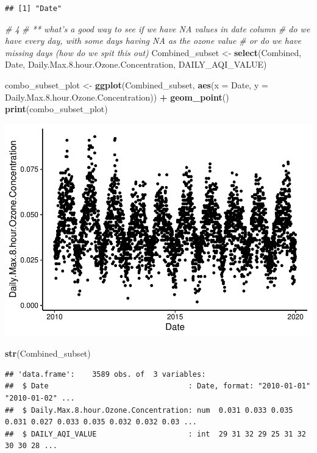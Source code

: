 \documentclass[]{article}
\newenvironment{Shaded}{\begin{snugshade}}{\end{snugshade}}
\newcommand{\CommentTok}[1]{\textcolor[rgb]{0.56,0.35,0.01}{\textit{#1}}}
\newcommand{\DataTypeTok}[1]{\textcolor[rgb]{0.13,0.29,0.53}{#1}}
\newcommand{\FloatTok}[1]{\textcolor[rgb]{0.00,0.00,0.81}{#1}}
\newcommand{\KeywordTok}[1]{\textcolor[rgb]{0.13,0.29,0.53}{\textbf{#1}}}
\newcommand{\NormalTok}[1]{#1}
\newcommand{\OperatorTok}[1]{\textcolor[rgb]{0.81,0.36,0.00}{\textbf{#1}}}
\newcommand{\StringTok}[1]{\textcolor[rgb]{0.31,0.60,0.02}{#1}}
\begin{document}
\begin{verbatim}
## [1] "Date"
\end{verbatim}

\begin{Shaded}
\begin{Highlighting}[]
\CommentTok{# 4}
\CommentTok{# ** what's a good way to see if we have NA values in date column}
  \CommentTok{# do we have every day, with some days having NA as the ozone value}
  \CommentTok{# or do we have missing days (how do we spit this out)}
\NormalTok{Combined_subset <-}\StringTok{ }\KeywordTok{select}\NormalTok{(Combined, Date, Daily.Max.}\FloatTok{8.}\NormalTok{hour.Ozone.Concentration, DAILY_AQI_VALUE)}

\NormalTok{combo_subset_plot <-}\StringTok{ }
\StringTok{  }\KeywordTok{ggplot}\NormalTok{(Combined_subset, }\KeywordTok{aes}\NormalTok{(}\DataTypeTok{x =}\NormalTok{ Date, }\DataTypeTok{y =}\NormalTok{ Daily.Max.}\FloatTok{8.}\NormalTok{hour.Ozone.Concentration)) }\OperatorTok{+}
\StringTok{  }\KeywordTok{geom_point}\NormalTok{()}
\KeywordTok{print}\NormalTok{(combo_subset_plot)}
\end{Highlighting}
\end{Shaded}

\includegraphics{A08_TimeSeries_files/figure-latex/unnamed-chunk-2-1.pdf}

\begin{Shaded}
\begin{Highlighting}[]
\KeywordTok{str}\NormalTok{(Combined_subset)}
\end{Highlighting}
\end{Shaded}

\begin{verbatim}
## 'data.frame':    3589 obs. of  3 variables:
##  $ Date                                : Date, format: "2010-01-01" "2010-01-02" ...
##  $ Daily.Max.8.hour.Ozone.Concentration: num  0.031 0.033 0.035 0.031 0.027 0.033 0.035 0.032 0.032 0.03 ...
##  $ DAILY_AQI_VALUE                     : int  29 31 32 29 25 31 32 30 30 28 ...
\end{verbatim}
\end{document}
